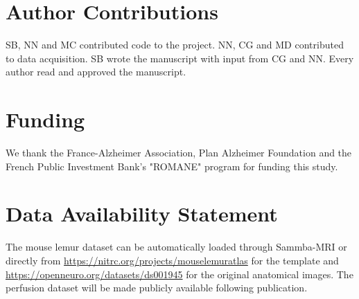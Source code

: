 \documentclass[utf8, a4paper, final, crop]{frontiersSCNS}
\begin{document}
\section*{Author Contributions}

SB, NN and MC contributed code to the project. NN, CG and MD contributed
to data acquisition. SB wrote the manuscript with input from CG and NN.
Every author read and approved the manuscript.

\section*{Funding}

We thank the France-Alzheimer Association, Plan Alzheimer Foundation
and the French Public Investment Bank's "ROMANE" program for funding this study.

\section*{Data Availability Statement}

The mouse lemur dataset can be automatically loaded through Sammba-MRI or
directly from \url{https://nitrc.org/projects/mouselemuratlas} for the template
and \url{https://openneuro.org/datasets/ds001945} for the original anatomical images. The perfusion
dataset will be made publicly available following publication.

 


\end{document}
